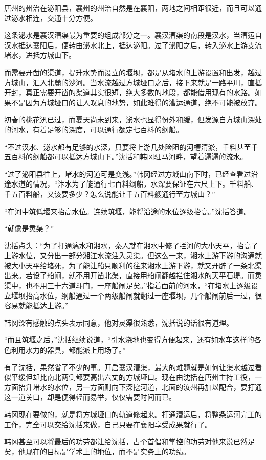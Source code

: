 唐州的州治在泌阳县，襄州的州治自然是在襄阳，两地之间相距很近，而且可以通过泌水相连，交通十分方便。

这条泌水是襄汉漕渠最为重要的组成部分之一。襄汉漕渠的南段是汉水，当漕运自汉水抵达襄阳后，便转由泌水北上，抵达泌阳。过了泌阳之后，转入泌水上游支流堵水，进抵方城山下。

而需要开凿的渠道，提升水势而设立的堰坝，都是从堵水的上游设置和出发，越过方城山，汇入北麓的沙河。当水流越过方城垭口之后，接下来就是一路平川，直抵开封，真正需要开凿的渠道其实很短，绝大多数的地段，都能借用现有的水路。如果不是因为方城垭口的让人叹息的地势，如此难得的漕运通道，绝不可能被放弃。

初春的桃花汛已过，而夏天尚未到来，泌水也显得份外和缓，但发源自方城山深处的河水，有着足够的深度，可以通行额定七百料的纲船。

“不过汉水、泌水都有足够的水深，只要将上游几处险阻的河槽清淤，千料甚至千五百料的纲船都可以抵达方城山下。”沈括和韩冈驻马河畔，望着潺潺的流水。

“过了泌阳县往上，堵水的河道可是变浅。”韩冈经过方城山南下时，已经查看过沿途水道的情况，“汴水为了能通行七百料纲船，水深要保证在六尺上下。千料船、千五百料船，又该要多少？怎么说能让千五百料艘通行至方城山？”

“在河中筑低堰来抬高水位。连续筑堰，能将沿途的水位逐级抬高。”沈括答道。

“就像是灵渠？”

沈括点头：“为了打通漓水和湘水，秦人就在湘水中修了拦河的大小天平，抬高了上游水位，又分出一部分湘江水流注入灵渠。但这么一来，湘水上游下游的沟通就被大小天平给堵死，为了能让船只顺利的往来湘水上游下游，就又开辟了一条北渠出来。若设了船闸，就不用开凿北渠，直接用船闸翻越拦住湘水的天平石堤。而灵渠中，也不用三十六道斗门，一座船闸足矣。”指着面前的河水，“在堵水上逐级设立堰坝抬高水位，纲船通过一个两级船闸就翻过一座堰坝，几个船闸前后一过，很容易就能抵达上游。”

韩冈深有感触的点头表示同意，他对灵渠很熟悉，沈括说的话很有道理。

“而且筑堰之后，”沈括继续说道，“引水浇地也变得方便起来，还有如水车这样的各色利用水力的器具，都能派上用场了。”

有了沈括，果然省了不少的事。开启襄汉漕渠，最大的难题就是如何让渠水越过看似平缓但却比南北两侧都要高出六丈的方城垭口。现在由沈括在唐州主持工役，一方面抬升堵水的水位，另一方面则向下深挖河道，北面的汝州再加以配合，要打通这一道关口，却是便得轻而易举，仅仅需要时间而已。

韩冈现在要做的，就是将方城垭口的轨道修起来。打通漕运后，将整条运河完工的工作，完全可以交给沈括来做，自己只要在襄阳享受成果就行了。

韩冈甚至可以将最后的功劳都让给沈括，占个首倡和掌控的功劳对他来说已然足矣，他现在的目标是学术上的地位，而不是实务上的功绩。

